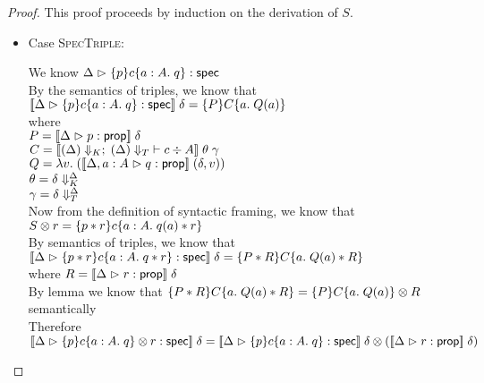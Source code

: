 \begin{proof}
  This proof proceeds by induction on the derivation of $S$. 

  \begin{itemize}
  \item Case \textsc{SpecTriple}: 
    \begin{tabbedproof}
      \oo We know $\judgeS{\spec{p}{c}{a:A}{q}}$ \\
      \oo By the semantics of triples, we know that 
          $\interp{\judgeS{\spec{p}{c}{a:A}{q}}}\;\delta = \spec{P}{C}{a}{Q(a)}$ \\ 
      \ox where \\
      \oox $P = \interp{\judgeA{p}{\assert}}\;\delta$ \\
      \oox $C = \interp{\judgeC[\restrictkind{\Delta}]{\restricttype{\Delta}}{c}{A}}\;\theta\;\gamma$ \\
      \oox $Q = \semfun{v}{(\interp{\judgeA[\Delta, a:A]{q}{\assert}}\;(\delta, v))}$ \\
      \oox $\theta = \restricttyenv{\Delta}{\delta}$ \\
      \oox $\gamma = \restrictvals{\Delta}{\delta}$ \\
      \oo Now from the definition of syntactic framing, we know that $\Frame{S}{r} = \spec{p * r}{c}{a:A}{q(a) * r}$ \\
      \oo By semantics of triples, we know that \\
      \oox $\interp{\judgeS{\spec{p * r}{c}{a:A}{q * r}}}\;\delta = \spec{P * R}{C}{a}{Q(a) * R}$ \\ 
      \ox where $R = \interp{\judgeA{r}{\assert}}\;\delta$ \\
      \oo By lemma we know that $\spec{P * R}{C}{a}{Q(a) * R} = \Frame{\spec{P}{C}{a}{Q(a)}}{R}$ 
          semantically \\
      \oo Therefore $\interp{\judgeS{\Frame{\spec{p}{c}{a:A}{q}}{r}}}\;\delta = 
                     \Frame{\interp{\judgeS{\spec{p}{c}{a:A}{q}}}\;\delta}{(\interp{\judgeA{r}{\assert}}\;\delta)}$
    \end{tabbedproof}


\end{itemize}
\end{proof}
